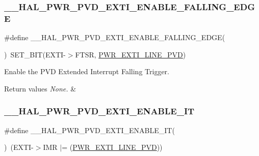 \subsubsection{\texorpdfstring{\+\_\+\+\_\+\+H\+A\+L\+\_\+\+P\+W\+R\+\_\+\+P\+V\+D\+\_\+\+E\+X\+T\+I\+\_\+\+E\+N\+A\+B\+L\+E\+\_\+\+F\+A\+L\+L\+I\+N\+G\+\_\+\+E\+D\+GE}{\_\_HAL\_PWR\_PVD\_EXTI\_ENABLE\_FALLING\_EDGE}}
{\footnotesize\ttfamily \#define \+\_\+\+\_\+\+H\+A\+L\+\_\+\+P\+W\+R\+\_\+\+P\+V\+D\+\_\+\+E\+X\+T\+I\+\_\+\+E\+N\+A\+B\+L\+E\+\_\+\+F\+A\+L\+L\+I\+N\+G\+\_\+\+E\+D\+GE(\begin{DoxyParamCaption}{ }\end{DoxyParamCaption})~S\+E\+T\+\_\+\+B\+IT(E\+X\+TI-\/$>$F\+T\+SR, \hyperlink{group___p_w_r___p_v_d___e_x_t_i___line_ga43a49255649e03d2d2b6b12c5c379d2b}{P\+W\+R\+\_\+\+E\+X\+T\+I\+\_\+\+L\+I\+N\+E\+\_\+\+P\+VD})}



Enable the P\+VD Extended Interrupt Falling Trigger. 


\begin{DoxyRetVals}{Return values}
{\em None.} & \\
\hline
\end{DoxyRetVals}
\mbox{\label{group___p_w_r___exported___macro_ga3180f039cf14ef78a64089f387f8f9c2}} 
\subsubsection{\texorpdfstring{\+\_\+\+\_\+\+H\+A\+L\+\_\+\+P\+W\+R\+\_\+\+P\+V\+D\+\_\+\+E\+X\+T\+I\+\_\+\+E\+N\+A\+B\+L\+E\+\_\+\+IT}{\_\_HAL\_PWR\_PVD\_EXTI\_ENABLE\_IT}}
{\footnotesize\ttfamily \#define \+\_\+\+\_\+\+H\+A\+L\+\_\+\+P\+W\+R\+\_\+\+P\+V\+D\+\_\+\+E\+X\+T\+I\+\_\+\+E\+N\+A\+B\+L\+E\+\_\+\+IT(\begin{DoxyParamCaption}{ }\end{DoxyParamCaption})~(E\+X\+TI-\/$>$I\+MR $\vert$= (\hyperlink{group___p_w_r___p_v_d___e_x_t_i___line_ga43a49255649e03d2d2b6b12c5c379d2b}{P\+W\+R\+\_\+\+E\+X\+T\+I\+\_\+\+L\+I\+N\+E\+\_\+\+P\+VD}))}



